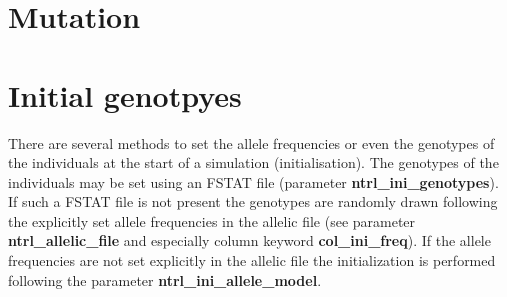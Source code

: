 \documentclass[letterpaper,12pt,oneside]{book}
\begin{document}
\section{Mutation}


\section{Initial genotpyes}\label{iniGenoNtrl}
There are several methods to set the allele frequencies or even the genotypes of the individuals at the start of a simulation (initialisation). The genotypes of the individuals may be set using an FSTAT file \citep{Goudet_1995} (parameter \textbf{ntrl\_ini\_genotypes}). If such a FSTAT file is not present the genotypes are randomly drawn following the explicitly set allele frequencies in the allelic file (see parameter \textbf{ntrl\_allelic\_file} and especially column keyword \textbf{col\_ini\_freq}). If the allele frequencies are not set explicitly in the allelic file the initialization is performed following the parameter \textbf{ntrl\_ini\_allele\_model}.  
\end{document}
